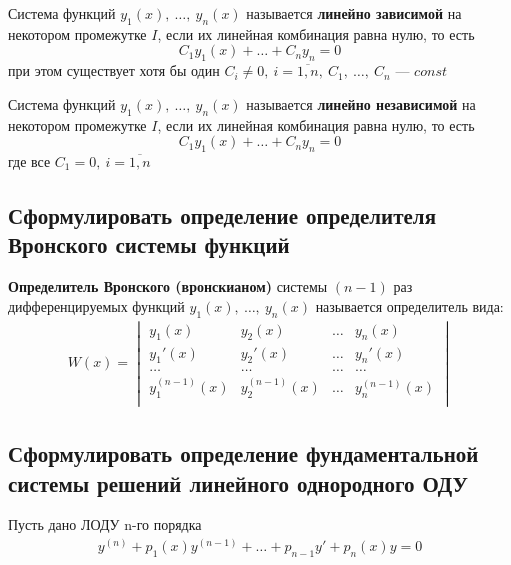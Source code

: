 \begin{definition*}
    Система функций $y_1(x),\ \ldots,\ y_n(x)$ называется \textbf{линейно зависимой} на некотором промежутке $I$, если их линейная комбинация равна нулю, то есть 
    \[
        C_1y_1(x) + \ldots + C_n y_n = 0
    \]
    при этом существует хотя бы один $C_i \ne 0,\ i = \overline{1,n},\ C_1,\ \ldots,\ C_n$ --- $const$
\end{definition*}

\begin{definition*}
    Система функций $y_1(x),\ \ldots,\ y_n(x)$ называется \textbf{линейно независимой} на некотором промежутке $I$, если их линейная комбинация равна нулю, то есть 
    \[
        C_1y_1(x) + \ldots + C_n y_n = 0
    \]
    где все $C_1 = 0,\ i = \overline{1,n}$
\end{definition*}

\subsection{Сформулировать определение определителя Вронского системы функций}

\begin{definition*}
    \textbf{Определитель Вронского (вронскианом)} системы $(n - 1)$ раз дифференцируемых функций $y_1 (x),\ \ldots,\ y_n(x)$ называется определитель вида:
    \begin{gather*}
        W (x) = \begin{vmatrix}
            y_1(x) & y_2(x) & \ldots & y_n(x) \\
            y_1'(x) & y_2'(x) & \ldots & y_n'(x) \\
            \ldots & \ldots & \ldots & \ldots \\
            y_1^{(n-1)}(x) & y_2^{(n-1)}(x) & \ldots & y_n^{(n-1)}(x) \\
        \end{vmatrix}
    \end{gather*}
\end{definition*}

\setcounter{equation}{0}
\subsection{Сформулировать определение фундаментальной системы решений линейного однородного ОДУ}

Пусть дано ЛОДУ n-го порядка
\begin{align}
    y^{(n)} + p_1(x) y^{(n-1)} + \ldots + p_{n-1} y' + p_n (x) y = 0
\end{align}


